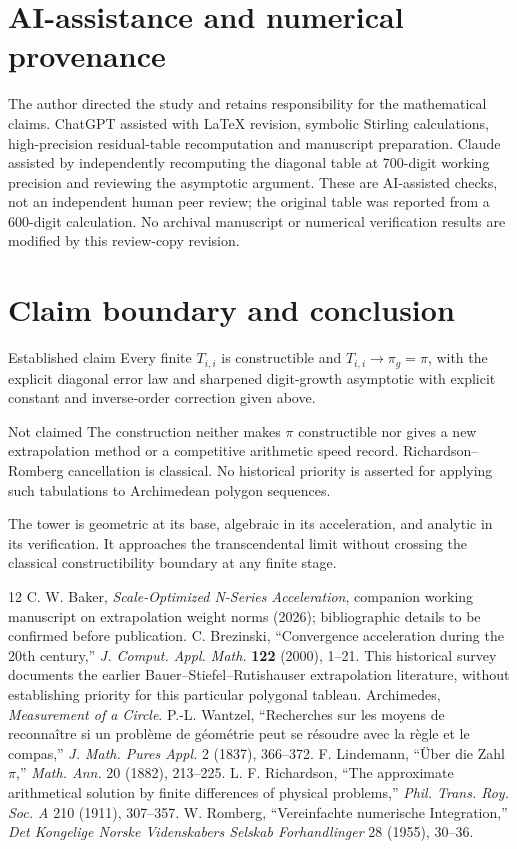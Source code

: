 \documentclass[11pt]{article}
\begin{document}
\section{AI-assistance and numerical provenance}
The author directed the study and retains responsibility for the mathematical claims. ChatGPT assisted with LaTeX revision, symbolic Stirling calculations, high-precision residual-table recomputation and manuscript preparation. Claude assisted by independently recomputing the diagonal table at 700-digit working precision and reviewing the asymptotic argument. These are AI-assisted checks, not an independent human peer review; the original table was reported from a 600-digit calculation. No archival manuscript or numerical verification results are modified by this review-copy revision.
\section{Claim boundary and conclusion}
\begin{claimbox}{Established claim}
Every finite $T_{i,i}$ is constructible and $T_{i,i}\to\pi_g=\pi$, with the explicit diagonal error law and sharpened digit-growth asymptotic with explicit constant and inverse-order correction given above.
\end{claimbox}
\begin{claimbox}{Not claimed}
The construction neither makes $\pi$ constructible nor gives a new extrapolation method or a competitive arithmetic speed record. Richardson--Romberg cancellation is classical. No historical priority is asserted for applying such tabulations to Archimedean polygon sequences.
\end{claimbox}
The tower is geometric at its base, algebraic in its acceleration, and analytic in its verification. It approaches the transcendental limit without crossing the classical constructibility boundary at any finite stage.
\newpage
\begin{thebibliography}{12}
 C. W. Baker, \emph{Scale-Optimized N-Series Acceleration}, companion working manuscript on extrapolation weight norms (2026); bibliographic details to be confirmed before publication.
 C. Brezinski, ``Convergence acceleration during the 20th century,'' \emph{J. Comput. Appl. Math.} \textbf{122} (2000), 1--21. This historical survey documents the earlier Bauer--Stiefel--Rutishauser extrapolation literature, without establishing priority for this particular polygonal tableau.
 Archimedes, \emph{Measurement of a Circle}.
 P.-L. Wantzel, ``Recherches sur les moyens de reconna\^itre si un probl\`eme de g\'eom\'etrie peut se r\'esoudre avec la r\`egle et le compas,'' \emph{J. Math. Pures Appl.} 2 (1837), 366--372.
 F. Lindemann, ``\"Uber die Zahl $\pi$,'' \emph{Math. Ann.} 20 (1882), 213--225.
 L. F. Richardson, ``The approximate arithmetical solution by finite differences of physical problems,'' \emph{Phil. Trans. Roy. Soc. A} 210 (1911), 307--357.
 W. Romberg, ``Vereinfachte numerische Integration,'' \emph{Det Kongelige Norske Videnskabers Selskab Forhandlinger} 28 (1955), 30--36.
\end{thebibliography}
\end{document}

